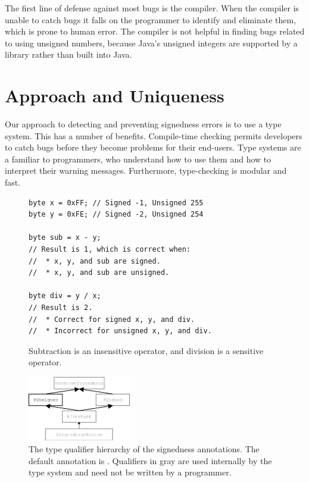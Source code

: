\documentclass{sig-alternate-05-2015}
\def\<#1>{\codeid{#1}}
\begin{document}
The first line of defense against most bugs is the compiler. When the
compiler is unable to catch bugs it falls on the programmer to identify and
eliminate them, which is prone to human error. The compiler
is not helpful in finding bugs related to using unsigned
numbers, because Java's unsigned
integers are supported by a library rather than built into Java.


\section{Approach and Uniqueness}

Our approach to detecting and preventing signedness errors is to use a type
system. This has a number of benefits.
%
Compile-time checking permits developers
to catch bugs before they become problems for their end-users.
%
Type systems are a familiar to programmers, who understand how to use them
and how to interpret their warning messages.
%
Furthermore, type-checking is modular and fast.

\begin{figure}
\vspace{-10pt}
\begin{lstlisting}
byte x = 0xFF; // Signed -1, Unsigned 255
byte y = 0xFE; // Signed -2, Unsigned 254

byte sub = x - y;
// Result is 1, which is correct when:
//  * x, y, and sub are signed.
//  * x, y, and sub are unsigned.

byte div = y / x;
// Result is 2.
//  * Correct for signed x, y, and div.
//  * Incorrect for unsigned x, y, and div.
\end{lstlisting}
\vspace{-10pt}
\caption{Subtraction is an insensitive operator, and
  division is a sensitive operator.}
\label{fig:operators}
\end{figure}


\begin{figure}
    \centering
    \includegraphics[width=0.4\textwidth]{signedness}
\vspace{-10pt}
    \caption{The type qualifier hierarchy of the signedness annotations.
The default annotation is \<@Signed>.
Qualifiers in gray are used internally by the type system and need not be
written by a programmer.}
    \label{fig:type-hierarchy}
\end{figure}
\end{document}
